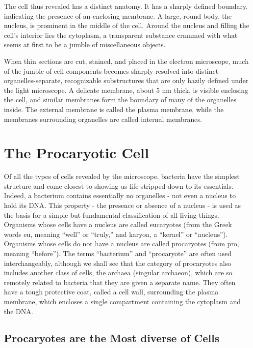 The cell thus revealed has a distinct anatomy. It has a sharply
defined boundary, indicating the presence of an enclosing membrane.
A large, round body, the nucleus, is prominent in the middle of the cell.
Around the nucleus and filling the cell’s interior lies the cytoplasm, a
transparent substance crammed with what seems at first to be a jumble
of miscellaneous objects.

When thin sections are cut, stained, and placed in the electron microscope,
much of the jumble of cell components becomes sharply resolved
into distinct organelles-separate, recognizable substructures that are
only hazily defined under the light microscope. A delicate membrane,
about 5 nm thick, is visible enclosing the cell, and similar membranes
form the boundary of many of the organelles inside. The
external membrane is called the plasma membrane, while the membranes
surrounding organelles are called internal membranes.

\section{The Procaryotic Cell}

Of all the types of cells revealed by the microscope, bacteria have the
simplest structure and come closest to showing us life stripped down to
its essentials. Indeed, a bacterium contains essentially no organelles - not
even a nucleus to hold its DNA. This property - the presence or absence of
a nucleus - is used as the basis for a simple but fundamental classification
of all living things. Organisms whose cells have a nucleus are called
eucaryotes (from the Greek words eu, meaning “well” or “truly,” and
karyon, a “kernel” or “nucleus”). Organisms whose cells do not have a
nucleus are called procaryotes (from pro, meaning “before”). The terms
“bacterium” and “procaryote” are often used interchangeably, although
we shall see that the category of procaryotes also includes another class
of cells, the archaea (singular archaeon), which are so remotely related to
bacteria that they are given a separate name.
They often have a tough protective coat, called a cell wall, surrounding the plasma
membrane, which encloses a single compartment containing the cytoplasm and the DNA.

\subsection{Procaryotes are the Most diverse of Cells}


